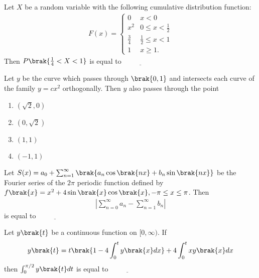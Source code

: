  \iffalse
        \chapter{2016}
        \author{AI24BTECH11034}
        \section{ma}
 \fi
\item Let $X$ be a random variable with the following cumulative distribution function:
\begin{align*}
F(x) = \begin{cases}
0 & x < 0 \\
x^2 & 0 \leq x < \frac{1}{2} \\
\frac{3}{4} & \frac{1}{2} \leq x < 1 \\
1 & x \geq 1.
\end{cases}
\end{align*}
Then $P\brak{\frac{1}{4} < X < 1}$ is equal to $\underline{\hspace{2cm}}$\\

\item Let $y$ be the curve which passes through $\brak{0,1}$ and intersects each curve of the family $y = cx^2$ orthogonally. Then $y$ also passes through the point
\begin{multicols}{2}
\begin{enumerate}
    \item $(\sqrt{2}, 0)$
    \item $(0, \sqrt{2})$
    \item $(1, 1)$
    \item $(-1, 1)$
\end{enumerate}
\end{multicols}

\item Let $S(x) = a_0 + \sum_{n=1}^{\infty}\brak{a_n \cos\brak{nx} + b_n \sin\brak{nx}}$ be the Fourier series of the $2\pi$ periodic function defined by $f\brak{x} = x^2 + 4\sin\brak{x}\cos\brak{x}, -\pi \leq x \leq \pi$. Then 
\begin{align*}
\left|\sum_{n=0}^{\infty} a_n - \sum_{n=1}^{\infty} b_n \right|
\end{align*}
is equal to $\underline{\hspace{2cm}}$\\

\item Let $y\brak{t}$ be a continuous function on $[0,\infty)$. If
\begin{align*}
y\brak{t}=t\brak{1-4\int_{0}^{t}y\brak{x}dx}+4\int_{0}^{t}xy\brak{x}dx
\end{align*}
then $\int_{0}^{\pi/2}y\brak{t}dt$ is equal to  $\underline{\hspace{2cm}}$\\

